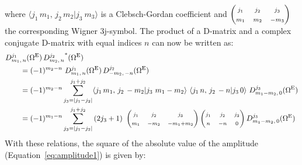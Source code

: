 %
where $\langle j_1\,m_1,\,j_2\,m_2|j_3\ m_3 \rangle$ is a Clebsch-Gordan coefficient and
$\begin{pmatrix} {\scriptstyle j_1} & {\scriptstyle j_2} & {\scriptstyle j_3} \\ {\scriptstyle m_1} & {\scriptstyle m_2} & {\scriptstyle -m_3}
\end{pmatrix}$ the corresponding Wigner 3j-symbol. The product of a D-matrix and a complex
conjugate D-matrix with equal indices $n$ can now be written as:
%
\begin{align}
  &D_{m_1,\,n}^{j_1}(\EulSet)\,{D_{m_2,\,n}^{j_2}}^*(\EulSet) \nonumber\\
  &\qquad= (-1)^{m_2-n}\ D_{m_1,\,n}^{j_1}(\EulSet)\,D_{-m_2,\,-n}^{j_2}(\EulSet) \nonumber\\
  &\qquad= (-1)^{m_2-n} \sum_{j_3=|j_1-j_2|}^{j_1+j_2}
    \langle j_1\,m_1,\,j_2\,-m_2|j_3\ m_1-m_2 \rangle\
    \langle j_1\,n,\,j_2\,-n|j_3\,0 \rangle\
    D_{m_1-m_2,\,0}^{j_3}(\EulSet) \nonumber\\
  &\qquad= (-1)^{m_1-n} \sum_{j_3=|j_1-j_2|}^{j_1+j_2} \left(2j_3+1\right)\
    \begin{pmatrix}
      \mss{j_1} & \mss{j_2} & \mss{j_3} \\
      \mss{m_1} & \mss{-m_2} & \mss{-m_1+m_2}
    \end{pmatrix}
    \begin{pmatrix}
      \mss{j_1} & \mss{j_2} & \mss{j_3} \\
      \mss{n} & \mss{-n} & \mss{0}
    \end{pmatrix}
    D_{m_1-m_2,\,0}^{j_3}(\EulSet)
\end{align}
%
With these relations, the square of the absolute value of the amplitude
(Equation~\ref{eq:amplitude1}) is given by:
%
